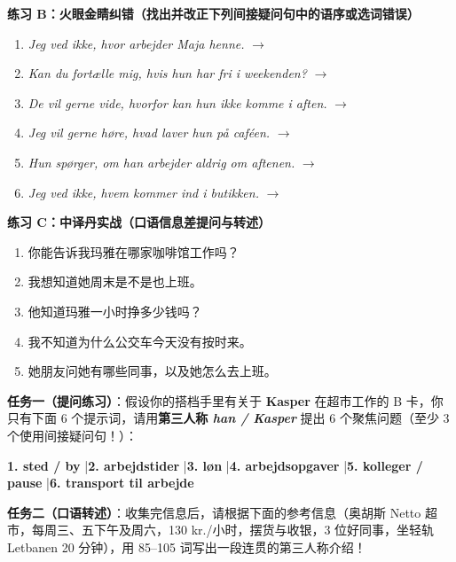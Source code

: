 \textbf{练习 B：火眼金睛纠错（找出并改正下列间接疑问句中的语序或选词错误）}
\begin{enumerate}
  \item \textit{Jeg ved ikke, hvor arbejder Maja henne.} $\rightarrow$
  \item \textit{Kan du fortælle mig, hvis hun har fri i weekenden?} $\rightarrow$
  \item \textit{De vil gerne vide, hvorfor kan hun ikke komme i aften.} $\rightarrow$
  \item \textit{Jeg vil gerne høre, hvad laver hun på caféen.} $\rightarrow$
  \item \textit{Hun spørger, om han arbejder aldrig om aftenen.} $\rightarrow$
  \item \textit{Jeg ved ikke, hvem kommer ind i butikken.} $\rightarrow$
\end{enumerate}

\textbf{练习 C：中译丹实战（口语信息差提问与转述）}
\begin{enumerate}
  \item 你能告诉我玛雅在哪家咖啡馆工作吗？
  \item 我想知道她周末是不是也上班。
  \item 他知道玛雅一小时挣多少钱吗？
  \item 我不知道为什么公交车今天没有按时来。
  \item 她朋友问她有哪些同事，以及她怎么去上班。
\end{enumerate}


\begin{tcolorbox}[enhanced, breakable, colback=NCDBgGray, colframe=NCDGray, coltitle=white, fonttitle=\bfseries, title={Mundtlig Opgave 2（DU3 Modul 2 口语信息差模拟卡）：Kaspers job i et supermarked}, arc=2pt, boxrule=0.8pt, borderline west={3pt}{0pt}{NCDRed}, left=10pt, right=10pt, top=7pt, bottom=7pt]
\textbf{任务一（提问练习）}：假设你的搭档手里有关于 \textbf{Kasper} 在超市工作的 B 卡，你只有下面 6 个提示词，请用\textbf{第三人称 \textit{han / Kasper}} 提出 6 个聚焦问题（至少 3 个使用间接疑问句！）：
\begin{center}
\small
\textbf{1. sted / by} \quad|\quad \textbf{2. arbejdstider} \quad|\quad \textbf{3. løn} \quad|\quad \textbf{4. arbejdsopgaver} \quad|\quad \textbf{5. kolleger / pause} \quad|\quad \textbf{6. transport til arbejde}
\end{center}
\textbf{任务二（口语转述）}：收集完信息后，请根据下面的参考信息（奥胡斯 Netto 超市，每周三、五下午及周六，130 kr./小时，摆货与收银，3 位好同事，坐轻轨 Letbanen 20 分钟），用 85--105 词写出一段连贯的第三人称介绍！
\end{tcolorbox}

